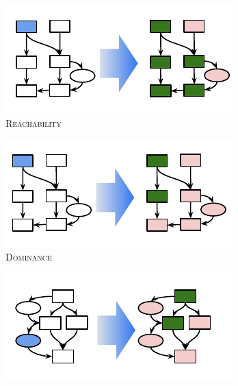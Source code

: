 \begin{figure}
  \centering
  \begin{subfigure}{.19\linewidth}
    \includegraphics[width=\linewidth]{images/dataflow/A_reachability}%
    \caption{\textsc{Reachability}}
    \label{subfig:dataflow_reachability}
  \end{subfigure}
  \hfill
  \begin{subfigure}{.19\linewidth}
    \includegraphics[width=\linewidth]{images/dataflow/B_dominance}%
    \caption{\textsc{Dominance}}
    \label{subfig:dataflow_dominance}
  \end{subfigure}
  \hfill
  \begin{subfigure}{.19\linewidth}
    \includegraphics[width=\linewidth]{images/dataflow/C_datadep}%

\end{subfigure}
\end{figure}
